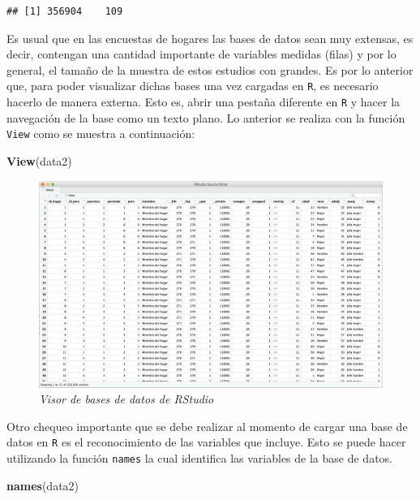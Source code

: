 \documentclass[
  12pt,
]{book}
\newenvironment{Shaded}{\begin{snugshade}}{\end{snugshade}}
\newcommand{\FunctionTok}[1]{\textcolor[rgb]{0.13,0.29,0.53}{\textbf{#1}}}
\newcommand{\NormalTok}[1]{#1}
\begin{document}
\begin{verbatim}
## [1] 356904    109
\end{verbatim}

Es usual que en las encuestas de hogares las bases de datos sean muy extensas, es decir, contengan una cantidad importante de variables medidas (filas) y por lo general, el tamaño de la muestra de estos estudios con grandes. Es por lo anterior que, para poder visualizar dichas bases una vez cargadas en \texttt{R}, es necesario hacerlo de manera externa. Esto es, abrir una pestaña diferente en \texttt{R} y hacer la navegación de la base como un texto plano. Lo anterior se realiza con la función \texttt{View} como se muestra a continuación:

\begin{Shaded}
\begin{Highlighting}[]
\FunctionTok{View}\NormalTok{(data2)}
\end{Highlighting}
\end{Shaded}

\begin{figure}
\centering
\includegraphics[width=8.85417in,height=\textheight,keepaspectratio]{Imagenes/Cap 0/1.png}
\caption{\emph{Visor de bases de datos de RStudio}}
\end{figure}

Otro chequeo importante que se debe realizar al momento de cargar una base de datos en \texttt{R} es el reconocimiento de las variables que incluye. Esto se puede hacer utilizando la función \texttt{names} la cual identifica las variables de la base de datos.

\begin{Shaded}
\begin{Highlighting}[]
\FunctionTok{names}\NormalTok{(data2)}
\end{Highlighting}
\end{Shaded}
\end{document}
